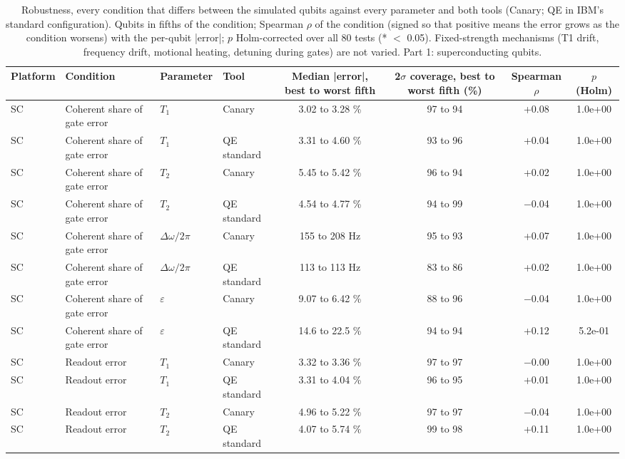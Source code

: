 \begin{table}[!t]
\centering
\footnotesize
\caption{Robustness, every condition that differs between the simulated qubits against every parameter and both tools (Canary; QE in IBM's standard configuration). Qubits in fifths of the condition; Spearman $\rho$ of the condition (signed so that positive means the error grows as the condition worsens) with the per-qubit |error|; $p$ Holm-corrected over all 80 tests (* $<$ 0.05). Fixed-strength mechanisms (T1 drift, frequency drift, motional heating, detuning during gates) are not varied. Part 1: superconducting qubits.}
\label{tab:s6}
\begin{adjustbox}{max width=\linewidth}
\begin{tabular}{llllcccc}
\hline
Platform & Condition & Parameter & Tool & Median |error|, best to worst fifth & 2$\sigma$ coverage, best to worst fifth (\%) & Spearman $\rho$ & $p$ (Holm) \\
\hline
SC & Coherent share of gate error & $T_1$ & Canary & 3.02 to 3.28 \% & 97 to 94 & +0.08 & 1.0e+00 \\
SC & Coherent share of gate error & $T_1$ & QE standard & 3.31 to 4.60 \% & 93 to 96 & +0.04 & 1.0e+00 \\
SC & Coherent share of gate error & $T_2$ & Canary & 5.45 to 5.42 \% & 96 to 94 & +0.02 & 1.0e+00 \\
SC & Coherent share of gate error & $T_2$ & QE standard & 4.54 to 4.77 \% & 94 to 99 & $-$0.04 & 1.0e+00 \\
SC & Coherent share of gate error & $\Delta\omega/2\pi$ & Canary & 155 to 208 Hz & 95 to 93 & +0.07 & 1.0e+00 \\
SC & Coherent share of gate error & $\Delta\omega/2\pi$ & QE standard & 113 to 113 Hz & 83 to 86 & +0.02 & 1.0e+00 \\
SC & Coherent share of gate error & $\varepsilon$ & Canary & 9.07 to 6.42 \% & 88 to 96 & $-$0.04 & 1.0e+00 \\
SC & Coherent share of gate error & $\varepsilon$ & QE standard & 14.6 to 22.5 \% & 94 to 94 & +0.12 & 5.2e-01 \\
SC & Readout error & $T_1$ & Canary & 3.32 to 3.36 \% & 97 to 97 & $-$0.00 & 1.0e+00 \\
SC & Readout error & $T_1$ & QE standard & 3.31 to 4.04 \% & 96 to 95 & +0.01 & 1.0e+00 \\
SC & Readout error & $T_2$ & Canary & 4.96 to 5.22 \% & 97 to 97 & $-$0.04 & 1.0e+00 \\
SC & Readout error & $T_2$ & QE standard & 4.07 to 5.74 \% & 99 to 98 & +0.11 & 1.0e+00 \\

\end{tabular}
\end{adjustbox}
\end{table}
